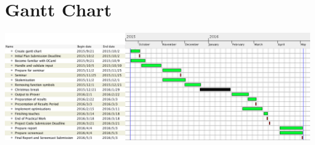 \chapter{Gantt Chart} \label{ganttchart}

\begin{center}
\includegraphics[angle=90,origin=c,scale=0.70]{ganttchart.png}
\end{center}
